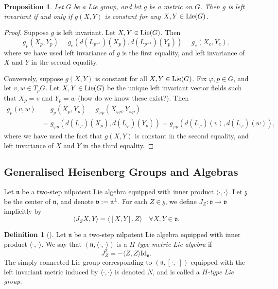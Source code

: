\documentclass{amsart}[]
\newcommand{\alert}[1]{\color{red}#1\color{black}}
\newcommand{\lie}{\text{\normalfont Lie}}
\theoremstyle{plain}
\newtheorem{proposition}[theorem]{Proposition}
\theoremstyle{definition}
\newtheorem{definition}[theorem]{Definition}
\theoremstyle{remark}
\begin{document}
	\begin{proposition}
		Let $G$ be a Lie group, and let $g$ be a metric on $G$. Then $g$ is left invariant if and only if $g(X,Y)$ is constant for any $X,Y \in \lie(G)$.
	\end{proposition}
	\begin{proof}
		Suppose $g$ is left invariant. Let $X,Y \in \lie(G)$. Then 
		$$g_p (X_p, Y_p) = g_e\left(d(L_{p^{-1}})(X_p), d(L_{p^{-1}})(Y_p)\right) = g_e(X_e,Y_e),$$
		where we have used left invariance of $g$ is the first equality, and left invariance of $X$ and $Y$ in the second equality.
		
		Conversely, suppose $g(X,Y)$ is constant for all $X,Y \in \lie(G)$. Fix $\varphi, p \in G$, and let $v,w \in T_p G$. Let $X,Y \in \lie(G)$ be the unique left invariant vector fields such that $X_p = v$ and $Y_p = w$ \alert{(how do we know these exist?)}. Then
		\begin{align*}
			g_p(v,w) &= g_p(X_p, Y_p) = g_{\varphi p}(X_{\varphi p}, Y_{\varphi p}) 
			\\
			&=g_{\varphi p}\left(d(L_{\varphi})(X_p),d(L_{\varphi})(Y_p) \right)= 
			g_{\varphi p}\left(d(L_{\varphi})(v),d(L_{\varphi})(w) \right),
		\end{align*}
		where we have used the fact that $g(X,Y)$ is constant in the second equality, and left invariance of $X$ and $Y$ in the third equality.
	\end{proof}

	

	\subsection{Generalised Heisenberg Groups and Algebras}
	Let $\mathfrak n$ be a two-step nilpotent Lie algebra equipped with inner product $\langle\cdot , \cdot \rangle$. Let $\mathfrak z$ be the center of $\mathfrak n$, and denote $\mathfrak v := \mathfrak n^\perp$. For each $Z \in \mathfrak z$, we define $J_Z: \mathfrak v \rightarrow \mathfrak v$ implicitly by 
	$$\langle J_Z X,Y \rangle = \langle [X,Y],Z \rangle \quad \forall X,Y \in \mathfrak v.$$

	\begin{definition}[\cite{eberlein}]
		Let $\mathfrak n$ be a two-step nilpotent Lie algebra equipped with inner product $\langle\cdot , \cdot \rangle$. We say that $(\mathfrak n, \langle\cdot , \cdot \rangle)$ is a \emph{$H$-type metric Lie algebra} if 
		$$J_Z^2 = -\langle Z,Z \rangle \text{Id}_{\mathfrak v}.$$
		The simply connected Lie group corresponding to $(\mathfrak n, [\cdot,\cdot])$ equipped with the left invariant metric induced by $\langle \cdot,\cdot \rangle$ is denoted $N$, and is called a \emph{$H$-type Lie group}.
	\end{definition}
	
\end{document}
